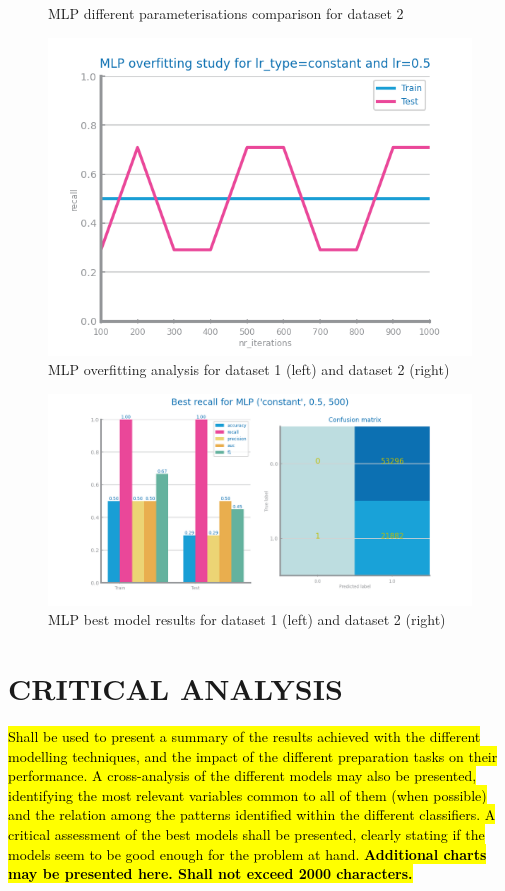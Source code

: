 \documentclass[10pt]{extarticle}
\newcommand{\ctext}[3][RGB]{%
  \begingroup
  \definecolor{hlcolor}{#1}{#2}\sethlcolor{hlcolor}%
  \hl{#3}%
  \endgroup
}
\begin{document}
\begin{figure}[H]
\caption{MLP different parameterisations comparison for dataset 2}
\end{figure}

\begin{figure}[H]
\centering\includegraphics[scale=0.95]{images/dataset1/models_evaluation/CovidPos_mlp_recall_overfitting.png}
\caption{MLP overfitting analysis for dataset 1 (left) and dataset 2 (right)}
\end{figure}

\begin{figure}[H]
\centering\includegraphics[scale=0.95]{images/dataset1/models_evaluation/CovidPos_mlp_MLP_best_recall_eval.png}
\caption{MLP best model results for dataset 1 (left) and dataset 2 (right)}
\end{figure}

\section{CRITICAL ANALYSIS}
\ctext[RGB]{190,190,190}{Shall be used to present a summary of the results achieved with the different modelling techniques, and the impact of the different preparation tasks on their performance. 
A cross-analysis of the different models may also be presented, identifying the most relevant variables common to all of them (when possible) and the relation among the patterns identified within the different classifiers.
A critical assessment of the best models shall be presented, clearly stating if the models seem to be good enough for the problem at hand. \textbf{Additional charts may be presented here.  Shall not exceed 2000 characters.}}
\end{document}
